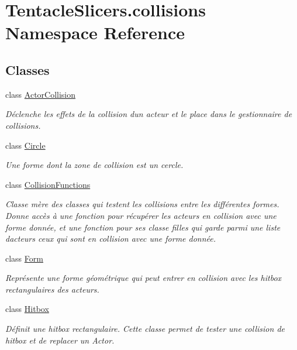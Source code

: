 \hypertarget{namespace_tentacle_slicers_1_1collisions}{}\section{Tentacle\+Slicers.\+collisions Namespace Reference}
\label{namespace_tentacle_slicers_1_1collisions}
\subsection*{Classes}
\begin{DoxyCompactItemize}
\item 
class \hyperlink{class_tentacle_slicers_1_1collisions_1_1_actor_collision}{Actor\+Collision}
\begin{DoxyCompactList}\small\item\em Déclenche les effets de la collision d\textquotesingle{}un acteur et le place dans le gestionnaire de collisions. \end{DoxyCompactList}\item 
class \hyperlink{class_tentacle_slicers_1_1collisions_1_1_circle}{Circle}
\begin{DoxyCompactList}\small\item\em Une forme dont la zone de collision est un cercle. \end{DoxyCompactList}\item 
class \hyperlink{class_tentacle_slicers_1_1collisions_1_1_collision_functions}{Collision\+Functions}
\begin{DoxyCompactList}\small\item\em Classe mère des classes qui testent les collisions entre les différentes formes. Donne accès à une fonction pour récupérer les acteurs en collision avec une forme donnée, et une fonction pour ses classe filles qui garde parmi une liste d\textquotesingle{}acteurs ceux qui sont en collision avec une forme donnée. \end{DoxyCompactList}\item 
class \hyperlink{class_tentacle_slicers_1_1collisions_1_1_form}{Form}
\begin{DoxyCompactList}\small\item\em Représente une forme géométrique qui peut entrer en collision avec les hitbox rectangulaires des acteurs. \end{DoxyCompactList}\item 
class \hyperlink{class_tentacle_slicers_1_1collisions_1_1_hitbox}{Hitbox}
\begin{DoxyCompactList}\small\item\em Définit une hitbox rectangulaire. Cette classe permet de tester une collision de hitbox et de replacer un Actor. \end{DoxyCompactList}\item 

\end{DoxyCompactItemize}
